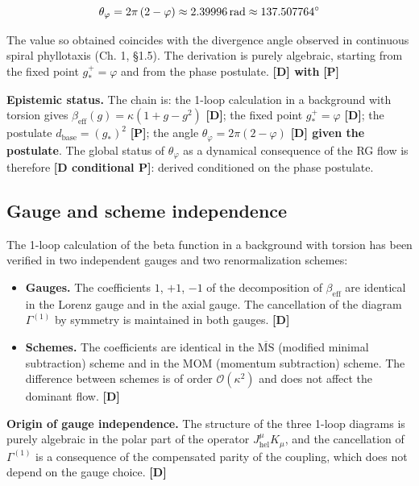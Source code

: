 ﻿\documentclass[11pt,letterpaper]{article}
\begin{document}
\begin{equation*}
  \resizebox{\ifdim\width>\linewidth \linewidth\else\width\fi}{!}{$\displaystyle \theta_\varphi = 2\pi\,(2 - \varphi) \approx 2{.}39996\,\text{rad} \approx 137{.}507764^\circ$}
\end{equation*}

The value so obtained coincides with the divergence angle observed in continuous spiral phyllotaxis (Ch. 1, §1.5). The derivation is purely algebraic, starting from the fixed point $g_*^+ = \varphi$ and from the phase postulate. \textbf{[D] with } \textbf{[P]}

\textbf{Epistemic status.} The chain is: the 1-loop calculation in a background with torsion gives $\beta_{\text{eff}}(g) = \kappa(1 + g - g^2)$ \textbf{[D]}; the fixed point $g_*^+ = \varphi$ \textbf{[D]}; the postulate $d_{\text{base}} = (g_*)^2$ \textbf{[P]}; the angle $\theta_\varphi = 2\pi(2 - \varphi)$ \textbf{[D] given the postulate}. The global status of $\theta_\varphi$ as a dynamical consequence of the RG flow is therefore \textbf{[D conditional P]}: derived conditioned on the phase postulate.
\subsection{Gauge and scheme independence}
The 1-loop calculation of the beta function in a background with torsion has been verified in two independent gauges and two renormalization schemes:

\begin{itemize}[leftmargin=*]
\item \textbf{Gauges.} The coefficients $1$, $+1$, $-1$ of the decomposition of $\beta_{\text{eff}}$ are identical in the Lorenz gauge and in the axial gauge. The cancellation of the diagram $\Gamma^{(1)}$ by symmetry is maintained in both gauges. \textbf{[D]}
\item \textbf{Schemes.} The coefficients are identical in the $\overline{\text{MS}}$ (modified minimal subtraction) scheme and in the MOM (momentum subtraction) scheme. The difference between schemes is of order $\mathcal{O}(\kappa^2)$ and does not affect the dominant flow. \textbf{[D]}
\end{itemize}

\textbf{Origin of gauge independence.} The structure of the three 1-loop diagrams is purely algebraic in the polar part of the operator $J_{\text{hel}}^\mu K_\mu$, and the cancellation of $\Gamma^{(1)}$ is a consequence of the compensated parity of the coupling, which does not depend on the gauge choice. \textbf{[D]}
\end{document}
